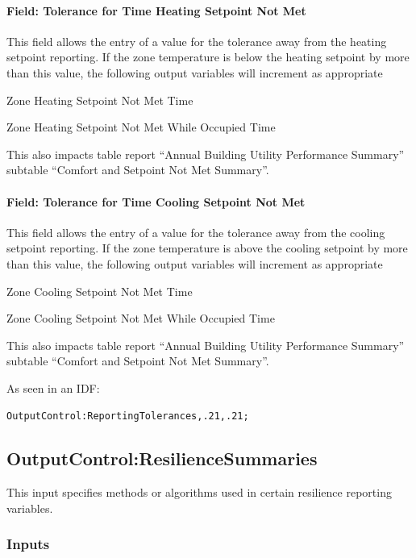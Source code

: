 \paragraph{Field: Tolerance for Time Heating Setpoint Not Met}\label{field-tolerance-for-time-heating-setpoint-not-met}

This field allows the entry of a value for the tolerance away from the heating setpoint reporting. If the zone temperature is below the heating setpoint by more than this value, the following output variables will increment as appropriate

Zone Heating Setpoint Not Met Time

Zone Heating Setpoint Not Met While Occupied Time

This also impacts table report ``Annual Building Utility Performance Summary'' subtable ``Comfort and Setpoint Not Met Summary''.

\paragraph{Field: Tolerance for Time Cooling Setpoint Not Met}\label{field-tolerance-for-time-cooling-setpoint-not-met}

This field allows the entry of a value for the tolerance away from the cooling setpoint reporting. If the zone temperature is above the cooling setpoint by more than this value, the following output variables will increment as appropriate

Zone Cooling Setpoint Not Met Time

Zone Cooling Setpoint Not Met While Occupied Time

This also impacts table report ``Annual Building Utility Performance Summary'' subtable ``Comfort and Setpoint Not Met Summary''.

As seen in an IDF:

\begin{lstlisting}
OutputControl:ReportingTolerances,.21,.21;
\end{lstlisting}

\subsection{OutputControl:ResilienceSummaries}\label{OutputControlResilienceSummaries}

This input specifies methods or algorithms used in certain resilience reporting variables.

\subsubsection{Inputs}\label{inputs-OutputControlResilienceSummaries}

